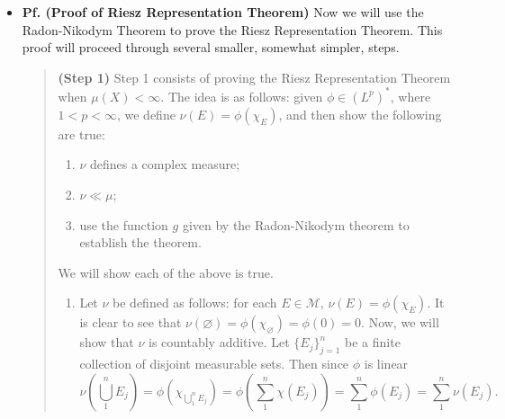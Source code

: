 \documentclass{article}
\begin{document}
\begin{itemize}
\begin{solutions}
		\begin{align}
			\begin{split}
				\infty &> \int_{X}\abs{g}^{q}\;d\mu \\
				&\geq \int_{X_{j_{0}}}\abs{g}^{q}\;d\mu \\
				&\geq j_{0}^{-q}\cdot \mu(X_{j_{0}}) = \infty, 
			\end{split}
		\end{align}
		which is a contradiction. Hence, for each $j$, $\mu(X_{j}) < \infty$, proving $\sigma$-finiteness. To see the importance of $q < \infty$, let $X$ be a non-$\sigma$-finite space, and $g$ be a nonzero constant function. Then clearly $g \in L^{q}$, but $\{g \neq 0\} = X$ is not $\sigma$-finite by hypothesis. 
	\end{solutions} 
	\item \textbf{Pf. (Proof of Riesz Representation Theorem)} Now we will use the Radon-Nikodym Theorem to prove the Riesz Representation Theorem. This proof will proceed through several smaller, somewhat simpler, steps. 
	\begin{quote}
		\textbf{(Step 1)} Step 1 consists of proving the Riesz Representation Theorem when $\mu(X) < \infty$. The idea is as follows: given $\phi \in (L^{p})^{\ast}$, where $1 < p < \infty$, we define $\nu(E) = \phi(\chi_{E})$, and then show the following are true: 
			\begin{enumerate}[itemsep =-2pt,label = (\arabic{*})]
				\item $\nu$ defines a complex measure; 
				\item  $\nu \ll \mu$; 
				\item use the function $g$ given by the Radon-Nikodym theorem to establish the theorem. 
			\end{enumerate} 
\begin{solutions}
	We will show each of the above is true. \vspace{-0.15cm}
	\begin{enumerate}[itemsep =-2pt,label = (\arabic{*})]
		\item Let $\nu$ be defined as follows: for each $E \in \mathscr{M}$, $\nu(E) =\phi(\chi_{E})$. It is clear to see that $\nu(\varnothing) = \phi(\chi_{\varnothing}) =\phi(0) = 0$. Now, we will show that $\nu$ is countably additive. Let $\{E_{j}\}_{j = 1}^{n}$ be a finite collection of disjoint measurable sets. Then since $\phi$ is linear 
		\begin{equation}
			\nu\left(\bigcup_{1}^{n}E_{j}\right) = \phi\left(\chi_{\bigcup_{1}^{n}E_{j}}\right) = \phi\left(\sum_{1}^{n}\chi(E_{j})\right) = \sum_{1}^{n}\phi(E_{j}) = \sum_{1}^{n}\nu(E_{j}). 

\end{equation}
\end{enumerate}
\end{solutions}
\end{quote}
\end{itemize}
\end{document}
